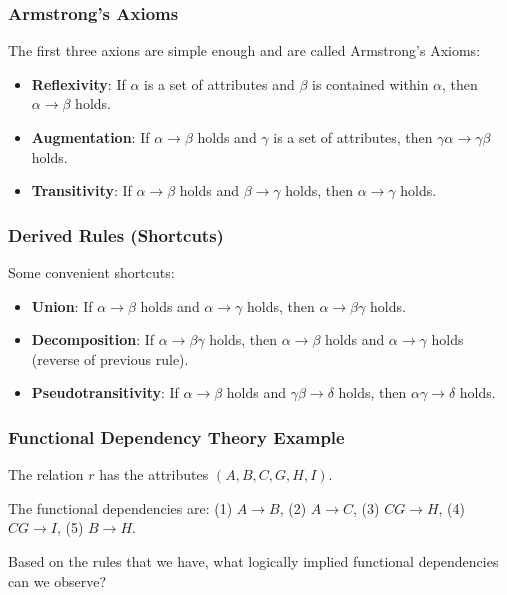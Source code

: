 \begin{frame}
\frametitle{Armstrong's Axioms}
The first three axions are simple enough and are called \alert{Armstrong's Axioms}:

\begin{itemize}
	\item \textbf{Reflexivity}: If $\alpha$ is a set of attributes and $\beta$ is contained within $\alpha$, then $\alpha \rightarrow \beta$ holds.
	\item \textbf{Augmentation}: If $\alpha \rightarrow \beta$ holds and $\gamma$ is a set of attributes, then $\gamma\alpha \rightarrow \gamma\beta$ holds.
	\item \textbf{Transitivity}: If $\alpha \rightarrow \beta$ holds and $\beta \rightarrow \gamma$ holds, then $\alpha \rightarrow \gamma$ holds.
\end{itemize}

\end{frame}



\begin{frame}
\frametitle{Derived Rules (Shortcuts)}

Some convenient shortcuts:

\begin{itemize}
	\item \textbf{Union}: If $\alpha \rightarrow \beta$ holds and $\alpha \rightarrow \gamma$ holds, then $\alpha \rightarrow \beta\gamma$ holds.
	\item \textbf{Decomposition}: If $\alpha \rightarrow \beta\gamma$ holds, then  $\alpha \rightarrow \beta$ holds and $\alpha \rightarrow \gamma$ holds (reverse of previous rule).
	\item \textbf{Pseudotransitivity}: If $\alpha \rightarrow \beta$ holds and $\gamma\beta \rightarrow \delta$ holds, then $\alpha\gamma \rightarrow \delta$ holds.
\end{itemize}

\end{frame}


\begin{frame}
\frametitle{Functional Dependency Theory Example}

The relation $r$ has the attributes $(A, B, C, G, H, I)$.

The functional dependencies are: (1) $A \rightarrow B$, (2) $A \rightarrow C$, (3) $CG \rightarrow H$, (4) $CG \rightarrow I$, (5) $B \rightarrow H$.

Based on the rules that we have, what logically implied functional dependencies can we observe?

\end{frame}




